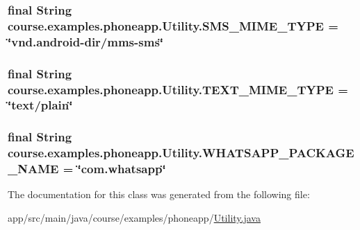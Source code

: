 \subsubsection[{S\+M\+S\+\_\+\+M\+I\+M\+E\+\_\+\+T\+Y\+P\+E}]{\setlength{\rightskip}{0pt plus 5cm}final String course.\+examples.\+phoneapp.\+Utility.\+S\+M\+S\+\_\+\+M\+I\+M\+E\+\_\+\+T\+Y\+P\+E = \char`\"{}vnd.\+android-\/dir/mms-\/sms\char`\"{}\hspace{0.3cm}{\ttfamily [static]}}\label{classcourse_1_1examples_1_1phoneapp_1_1_utility_a6b677db05046c2fcb1b6770f39bf35f2}
\hypertarget{classcourse_1_1examples_1_1phoneapp_1_1_utility_a35835b9e24f4150c50657a03448919da}{}
\subsubsection[{T\+E\+X\+T\+\_\+\+M\+I\+M\+E\+\_\+\+T\+Y\+P\+E}]{\setlength{\rightskip}{0pt plus 5cm}final String course.\+examples.\+phoneapp.\+Utility.\+T\+E\+X\+T\+\_\+\+M\+I\+M\+E\+\_\+\+T\+Y\+P\+E = \char`\"{}text/plain\char`\"{}\hspace{0.3cm}{\ttfamily [static]}}\label{classcourse_1_1examples_1_1phoneapp_1_1_utility_a35835b9e24f4150c50657a03448919da}
\hypertarget{classcourse_1_1examples_1_1phoneapp_1_1_utility_ade5eb8c8a3772fbacb49d38f450ca9b5}{}
\subsubsection[{W\+H\+A\+T\+S\+A\+P\+P\+\_\+\+P\+A\+C\+K\+A\+G\+E\+\_\+\+N\+A\+M\+E}]{\setlength{\rightskip}{0pt plus 5cm}final String course.\+examples.\+phoneapp.\+Utility.\+W\+H\+A\+T\+S\+A\+P\+P\+\_\+\+P\+A\+C\+K\+A\+G\+E\+\_\+\+N\+A\+M\+E = \char`\"{}com.\+whatsapp\char`\"{}\hspace{0.3cm}{\ttfamily [static]}}\label{classcourse_1_1examples_1_1phoneapp_1_1_utility_ade5eb8c8a3772fbacb49d38f450ca9b5}


The documentation for this class was generated from the following file\+:\begin{DoxyCompactItemize}
\item 
app/src/main/java/course/examples/phoneapp/\hyperlink{_utility_8java}{Utility.\+java}\end{DoxyCompactItemize}
